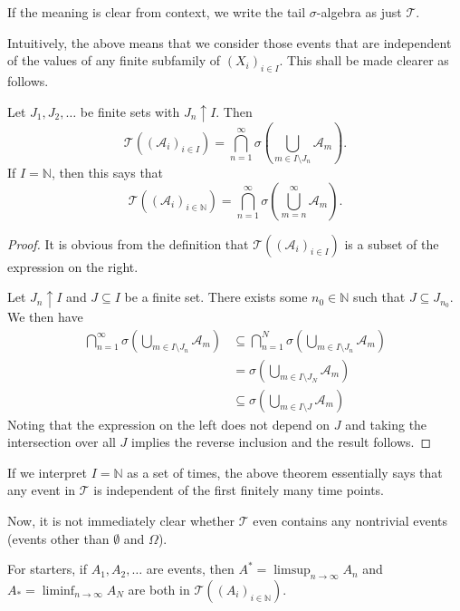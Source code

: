 If the meaning is clear from context, we write the tail $\sigma$-algebra as just $\mathcal{T}$.

Intuitively, the above means that we consider those events that are independent of the values of any finite subfamily of $(X_i)_{i\in I}$. This shall be made clearer as follows.

\begin{theorem}
    Let $J_1,J_2,\ldots$ be finite sets with $J_n\uparrow I$. Then
    $$\mathcal{T}((\mathcal{A}_i)_{i\in I})=\bigcap_{n=1}^\infty \sigma\left(\bigcup_{m\in I\setminus J_n} \mathcal{A}_m\right).$$
    If $I=\mathbb{N}$, then this says that
    $$\mathcal{T}((\mathcal{A}_i)_{i\in\mathbb{N}}) = \bigcap_{n=1}^\infty \sigma\left(\bigcup_{m=n}^\infty \mathcal{A}_m\right).$$
\end{theorem}
\begin{proof}
    It is obvious from the definition that $\mathcal{T}((\mathcal{A}_i)_{i\in I})$ is a subset of the expression on the right.
    
    Let $J_n\uparrow I$ and $J\subseteq I$ be a finite set. There exists some $n_0\in\mathbb{N}$ such that $J\subseteq J_{n_0}$. We then have
    \begin{align*}
        \bigcap_{n=1}^\infty \sigma\left(\bigcup_{m\in I\setminus J_n} \mathcal{A}_m\right) &\subseteq \bigcap_{n=1}^N \sigma\left(\bigcup_{m\in I\setminus J_n} \mathcal{A}_m\right) \\
        &= \sigma\left(\bigcup_{m\in I\setminus J_N} \mathcal{A}_m\right) \\
        &\subseteq \sigma\left(\bigcup_{m\in I\setminus J} \mathcal{A}_m\right)
    \end{align*}
    Noting that the expression on the left does not depend on $J$ and taking the intersection over all $J$ implies the reverse inclusion and the result follows.
\end{proof}

If we interpret $I=\mathbb{N}$ as a set of times, the above theorem essentially says that any event in $\mathcal{T}$ is independent of the first finitely many time points.

\vspace{2mm}
Now, it is not immediately clear whether $\mathcal{T}$ even contains any nontrivial events (events other than $\emptyset$ and $\Omega$).

\vspace{2mm}
For starters, if $A_1,A_2,\ldots$ are events, then $A^*=\limsup_{n\to\infty} A_n$ and $A_*=\liminf_{n\to\infty} A_N$ are both in $\mathcal{T}((A_i)_{i\in \mathbb{N}})$.

